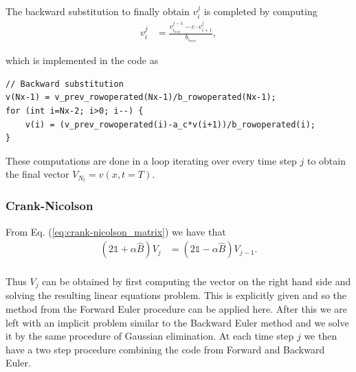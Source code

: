\documentclass[12pt]{article}
\begin{document}
\begin{flushleft}
The backward substitution to finally obtain $v_i^{j}$ is completed by computing
\vspace{5mm}
\begin{align*}
    v_{i}^{j} & = \frac{v_{i_{new}}^{j-1} - c\cdot v_{i+1}^{j}}{b_{i_{new}}},
\end{align*} 
\vspace{5mm}

which is implemented in the code as
\begin{lstlisting}
// Backward substitution
v(Nx-1) = v_prev_rowoperated(Nx-1)/b_rowoperated(Nx-1);
for (int i=Nx-2; i>0; i--) {
    v(i) = (v_prev_rowoperated(i)-a_c*v(i+1))/b_rowoperated(i);
}           
\end{lstlisting}

These computations are done in a loop iterating over every time step $j$
to obtain the final vector $V_{N_t} = v(x, t=T)$.

\subsubsection{Crank-Nicolson}
From Eq. (\ref{eq:crank-nicolson_matrix}) we have that
\begin{align*}
    (2\mathbb{1}+\alpha\hat{B})V_j &= (2\mathbb{1}-\alpha\hat{B})V_{j-1}.
\end{align*}\\
\vspace{5mm}
Thus $V_j$ can be obtained by first computing the vector on the right hand
side and solving the resulting linear equations problem.
This is explicitly given and so the method from the Forward Euler
procedure can be applied here. After this we are left with an implicit problem
similar to the Backward Euler method and we solve it by the same procedure
of Gaussian elimination. At each time step $j$ we then have a two step
procedure combining the code from Forward and Backward Euler.


\end{flushleft}
\end{document}
